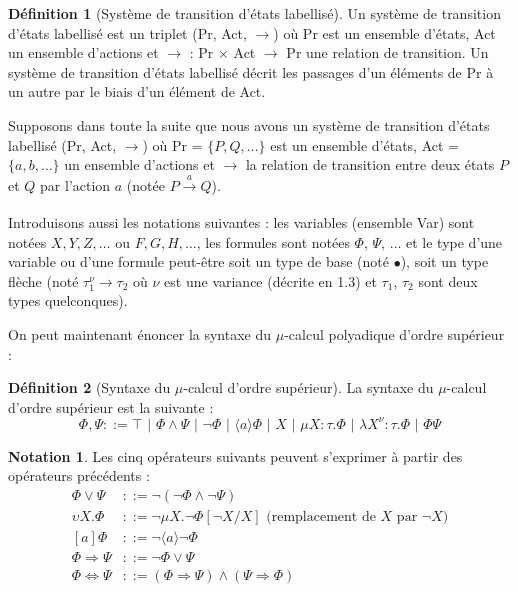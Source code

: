 \documentclass[11pt,a4paper]{article}
\theoremstyle{plain}
\theoremstyle{remark}
\theoremstyle{definition}
\newtheorem{notat}{Notation}
\newtheorem{dfn}{Définition}
\begin{document}
\begin{dfn}[Système de transition d'états labellisé] Un système de transition d'états labellisé est un triplet {(Pr, Act, $\rightarrow$)} où Pr est un ensemble d'états, Act un ensemble d'actions et $\rightarrow$ : Pr $\times$ Act $\rightarrow$ Pr une relation de transition. Un système de transition d'états labellisé décrit les passages d'un éléments de Pr à un autre par le biais d'un élément de Act.  
\end{dfn}

Supposons dans toute la suite que nous avons un système de transition d'états labellisé (Pr, Act, $\rightarrow$) où Pr = $\{P, Q, \ldots\}$ est un ensemble d'états, Act = $\{a, b,\ldots\}$ un ensemble d'actions et $\rightarrow$ la relation de transition entre deux états $P$ et $Q$ par l'action $a$ (notée $P\xrightarrow[]{a} Q$).  

Introduisons aussi les notations suivantes : les variables (ensemble Var) sont notées $X, Y, Z, \ldots$ ou $F, G, H, \ldots$, les formules sont notées $\Phi$, $\Psi$, $\ldots$ et le type d'une variable ou d'une formule peut-être soit un type de base (noté $\bullet$), soit un type flèche (noté $\tau_1^{\nu} \rightarrow \tau_2$ où $\nu$ est une variance (décrite en 1.3) et $\tau_1$, $\tau_2$ sont deux types quelconques).

On peut maintenant énoncer la syntaxe du $\mu$-calcul polyadique d'ordre supérieur :

\begin{dfn}[Syntaxe du $\mu$-calcul d'ordre supérieur] La syntaxe du $\mu$-calcul d'ordre supérieur est la suivante :
\[\Phi, \Psi ::= \top \text{ | } \Phi \wedge \Psi \text{ | } \neg\Phi \text{ | } \langle a \rangle \Phi \text{ | } X \text{ | } \mu X : \tau . \Phi \text{ | } \lambda X^{\nu} : \tau . \Phi \text{ | } \Phi \Psi\]
\end{dfn}

\begin{notat} Les cinq opérateurs suivants peuvent s'exprimer à partir des opérateurs précédents : 
\begin{align*}
	\Phi \vee \Psi &::= \neg (\neg \Phi \wedge \neg \Psi)\\
	\upsilon X . \Phi &::= \neg \mu X . \neg \Phi [\neg X/X] \text{ (remplacement de } X \text{ par } \neg X)\\
	[a] \Phi &::= \neg \langle a \rangle \neg \Phi\\
	\Phi \Rightarrow \Psi &::= \neg \Phi \vee \Psi\\
	\Phi \Leftrightarrow \Psi &::= (\Phi \Rightarrow \Psi) \wedge (\Psi \Rightarrow \Phi)
\end{align*}
\end{notat}
\end{document}
